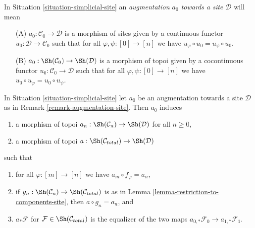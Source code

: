 \begin{remark}
\label{remark-augmentation-site}
In Situation \ref{situation-simplicial-site} an
{\it augmentation $a_0$ towards a site $\mathcal{D}$} will mean
\begin{enumerate}
\item[(A)] $a_0 : \mathcal{C}_0 \to \mathcal{D}$ is a morphism of sites
given by a continuous functor $u_0 : \mathcal{D} \to \mathcal{C}_0$
such that for all $\varphi, \psi : [0] \to [n]$ we have
$u_\varphi \circ u_0 = u_\psi \circ u_0$.
\item[(B)] $a_0 : \Sh(\mathcal{C}_0) \to \Sh(\mathcal{D})$ is a morphism
of topoi given by a cocontinuous functor $u_0 : \mathcal{C}_0 \to \mathcal{D}$
such that for all $\varphi, \psi : [0] \to [n]$ we have
$u_0 \circ u_\varphi = u_0 \circ u_\psi$.
\end{enumerate}
\end{remark}

\begin{lemma}
\label{lemma-augmentation-site}
In Situation \ref{situation-simplicial-site} let $a_0$ be an
augmentation towards a site $\mathcal{D}$ as in
Remark \ref{remark-augmentation-site}. Then $a_0$ induces
\begin{enumerate}
\item a morphism of topoi $a_n : \Sh(\mathcal{C}_n) \to \Sh(\mathcal{D})$
for all $n \geq 0$,
\item a morphism of topoi $a : \Sh(\mathcal{C}_{total}) \to \Sh(\mathcal{D})$
\end{enumerate}
such that
\begin{enumerate}
\item for all $\varphi : [m] \to [n]$ we have $a_m \circ f_\varphi = a_n$,
\item if $g_n : \Sh(\mathcal{C}_n) \to \Sh(\mathcal{C}_{total})$
is as in Lemma \ref{lemma-restriction-to-components-site}, then
$a \circ g_n = a_n$, and
\item $a_*\mathcal{F}$ for $\mathcal{F} \in \Sh(\mathcal{C}_{total})$
is the equalizer of the two maps
$a_{0, *}\mathcal{F}_0 \to a_{1, *}\mathcal{F}_1$.
\end{enumerate}
\end{lemma}

